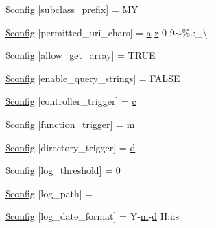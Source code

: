 \begin{DoxyCompactItemize}
\hyperlink{ci_2application_2config_2config_8php_a51b79c9e455d64cb54212f2966b28ae6}{\$config} \mbox{[}\textquotesingle{}subclass\+\_\+prefix\textquotesingle{}\mbox{]} = \textquotesingle{}M\+Y\+\_\+\textquotesingle{}
\item 
\hyperlink{ci_2application_2config_2config_8php_ae2e36375b245287a8851ac04565994de}{\$config} \mbox{[}\textquotesingle{}permitted\+\_\+uri\+\_\+chars\textquotesingle{}\mbox{]} = \textquotesingle{}\hyperlink{_chart_8min_8js_aef3b685c08bc6c76c8e729bd0e93901d}{a}-\/\hyperlink{_chart_8min_8js_a4a73770ab69578dc29ec14afeaf50228}{z} 0-\/9$\sim$\%.\+:\+\_\+\textbackslash{}-\/\textquotesingle{}
\item 
\hyperlink{ci_2application_2config_2config_8php_ac714a2702b430e47833d82d6ee590298}{\$config} \mbox{[}\textquotesingle{}allow\+\_\+get\+\_\+array\textquotesingle{}\mbox{]} = T\+R\+UE
\item 
\hyperlink{ci_2application_2config_2config_8php_a227b7a6fec0306454ffb0dead1f1c4f7}{\$config} \mbox{[}\textquotesingle{}enable\+\_\+query\+\_\+strings\textquotesingle{}\mbox{]} = F\+A\+L\+SE
\item 
\hyperlink{ci_2application_2config_2config_8php_a7ea9e139536f27af75812de53e852829}{\$config} \mbox{[}\textquotesingle{}controller\+\_\+trigger\textquotesingle{}\mbox{]} = \textquotesingle{}\hyperlink{fullpage_2plugin_8min_8js_a92587cc54822a9f38871b2d0e0952da1}{c}\textquotesingle{}
\item 
\hyperlink{ci_2application_2config_2config_8php_acac6a7410b2ae72152894e3b93501811}{\$config} \mbox{[}\textquotesingle{}function\+\_\+trigger\textquotesingle{}\mbox{]} = \textquotesingle{}\hyperlink{_chart_8min_8js_a9e77e016b2928d7dcb493b89a0c9dc32}{m}\textquotesingle{}
\item 
\hyperlink{ci_2application_2config_2config_8php_af7e6593d4088b77d153dafff4567f143}{\$config} \mbox{[}\textquotesingle{}directory\+\_\+trigger\textquotesingle{}\mbox{]} = \textquotesingle{}\hyperlink{fullpage_2plugin_8min_8js_a86138ad7596633fd5f960ad9c40f8862}{d}\textquotesingle{}
\item 
\hyperlink{ci_2application_2config_2config_8php_a7e7fe9a5aa2c85e48865b154035dab6a}{\$config} \mbox{[}\textquotesingle{}log\+\_\+threshold\textquotesingle{}\mbox{]} = 0
\item 
\hyperlink{ci_2application_2config_2config_8php_aee8524f2388d21b1c73de5c48a82b687}{\$config} \mbox{[}\textquotesingle{}log\+\_\+path\textquotesingle{}\mbox{]} = \textquotesingle{}\textquotesingle{}
\item 
\hyperlink{ci_2application_2config_2config_8php_a9cc05811c32c13c55ed407435a3a31b6}{\$config} \mbox{[}\textquotesingle{}log\+\_\+date\+\_\+format\textquotesingle{}\mbox{]} = \textquotesingle{}Y-\/\hyperlink{_chart_8min_8js_a9e77e016b2928d7dcb493b89a0c9dc32}{m}-\/\hyperlink{fullpage_2plugin_8min_8js_a86138ad7596633fd5f960ad9c40f8862}{d} H\+:i\+:s\textquotesingle{}

\end{DoxyCompactItemize}
